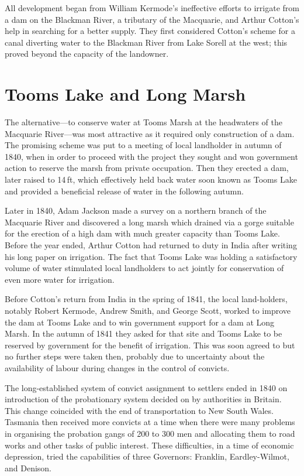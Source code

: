 All development began from William Kermode's ineffective efforts to
irrigate from a dam on the Blackman River, a tributary of the
Macquarie, and Arthur Cotton's help in searching for a better supply.
They first considered Cotton's scheme for a canal diverting water to
the Blackman River from Lake Sorell at the west; this proved beyond
the capacity of the landowner.

\section*{Tooms Lake and Long Marsh}

The alternative---to conserve water at Tooms Marsh at the headwaters
of the Macquarie River---was most attractive as it required only
construction of a dam.  The promising scheme was put to a meeting of
local landholder in autumn of 1840, when in order to proceed with the
project they sought and won government action to reserve the marsh
from private occupation.  Then they erected a dam, later raised to
14\,ft, which effectively held back water soon known as Tooms Lake and
provided a beneficial release of water in the following
autumn.

Later in 1840, Adam Jackson made a survey on a northern branch of the
Macquarie River and discovered a long marsh which drained via a gorge
suitable for the erection of a high dam with much greater capacity
than Tooms Lake.  Before the year ended, Arthur Cotton had returned to
duty in India after writing his long paper on irrigation.  The fact
that Tooms Lake was holding a satisfactory volume of water stimulated
local landholders to act jointly for conservation of even more water
for irrigation.

Before Cotton's return from India in the spring of 1841, the local
land-holders, notably Robert Kermode, Andrew Smith, and George Scott,
worked to improve the dam at Tooms Lake and to win government support
for a dam at Long Marsh.  In the autumn of 1841 they asked for that
site and Tooms Lake to be reserved by government for the benefit of
irrigation.  This was soon
agreed to but no further steps were taken then, probably due to
uncertainty about the availability of labour during changes in the
control of convicts.

The long-established system of convict assignment to settlers ended in
1840 on introduction of the probationary system decided on by
authorities in Britain.  This change coincided with the end of
transportation to New South Wales.  Tasmania then received more
convicts at a time when there were many problems in organising the
probation gangs of 200 to 300 men and allocating them to road works
and other tasks of public interest.  These difficulties, in a time of
economic depression, tried the capabilities of three Governors:
Franklin, Eardley-Wilmot, and Denison.

